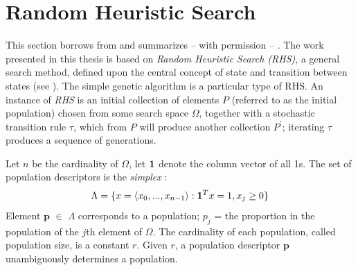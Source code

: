 \section{Random Heuristic Search}
\label{RHS}
This section borrows from and summarizes -- with permission -- \cite{Vose1999}.
The work presented in this thesis is based on {\em Random Heuristic Search (RHS)}, 
a general search method, defined upon the central concept of state and transition 
between states (see \cite{Vose1999}). The simple genetic algorithm is a particular type of RHS. 
An instance of {\em RHS} is an initial collection of elements $P$ (referred to as the initial population) chosen 
from some search space $\Omega$, together with a stochastic transition rule $\tau$, which from $P$ will 
produce another collection $P^\prime$; iterating $\tau$ produces a sequence of generations.

Let $n$ be the cardinality 
of $\Omega$, let ${\bf1}$ denote the column vector of all 1s. 
The set of population descriptors is the  {\em simplex \/}:
\[
\Lambda = \{x = \langle x_0,...,x_{n-1} \rangle: {\bf1}^T x=1, x_j \geq 0 \} %
\]
Element $\bm{p}$ $\in$ $\Lambda$ corresponds to a population;
$p_j$ = the proportion in the population of the $j$th element of $\Omega$. 
The cardinality of each population, called population size, is a constant $r$. 
Given $r$, a population descriptor $\bm{p}$ unambiguously determines a population.

